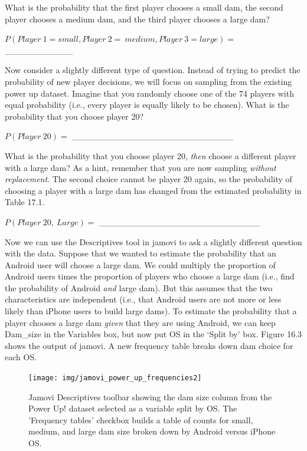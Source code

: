 \documentclass[
]{scrbook}
\begin{document}
What is the probability that the first player chooses a small dam, the second player chooses a medium dam, and the third player chooses a large dam?

\(P(Player\:1 = small,Player\:2 = \:medium,Player\:3 = large) =\) \_\_\_\_\_\_\_\_\_\_\_

Now consider a slightly different type of question.
Instead of trying to predict the probability of new player decisions, we will focus on sampling from the existing power up dataset.
Imagine that you randomly choose one of the 74 players with equal probability (i.e., every player is equally likely to be chosen).
What is the probability that you choose player 20?

\(P(Player\:20) =\) \_\_\_\_\_\_\_\_\_\_\_\_\_\_\_\_\_\_\_\_\_\_\_\_\_\_

What is the probability that you choose player 20, \emph{then} choose a different player with a large dam?
As a hint, remember that you are now sampling \emph{without replacement}.
The second choice cannot be player 20 again, so the probability of choosing a player with a large dam has changed from the estimated probability in Table 17.1.

\(P(Player\:20,\:Large) =\) \_\_\_\_\_\_\_\_\_\_\_\_\_\_\_\_\_\_\_\_\_\_\_\_\_\_

Now we can use the Descriptives tool in jamovi to ask a slightly different question with the data.
Suppose that we wanted to estimate the probability that an Android user will choose a large dam.
We could multiply the proportion of Android users times the proportion of players who choose a large dam (i.e., find the probability of Android \emph{and} large dam).
But this assumes that the two characteristics are independent (i.e., that Android users are not more or less likely than iPhone users to build large dams).
To estimate the probability that a player chooses a large dam \emph{given} that they are using Android, we can keep Dam\_size in the Variables box, but now put OS in the `Split by' box.
Figure 16.3 shows the output of jamovi.
A new frequency table breaks down dam choice for each OS.

\begin{figure}
\texttt{[image: img/jamovi\_power\_up\_frequencies2]} \caption{Jamovi Descriptives toolbar showing the dam size column from the Power Up! dataset selected as a variable split by OS. The 'Frequency tables' checkbox builds a table of counts for small, medium, and large dam size broken down by Android versus iPhone OS.}\label{fig:unnamed-chunk-73}
\end{figure}
\end{document}
